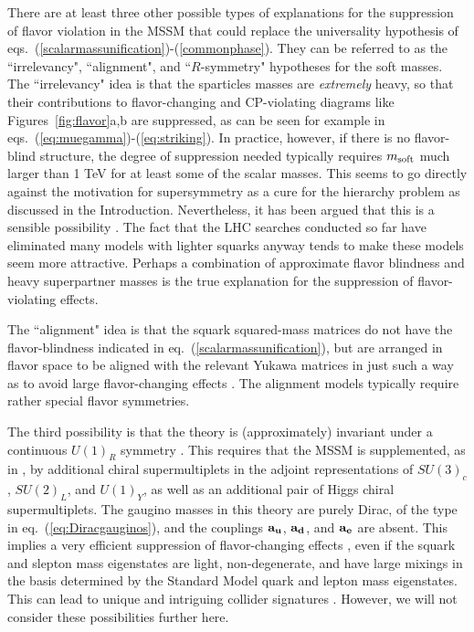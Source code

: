 \documentclass[11pt]{article}
\begin{document}
There are at least three other 
possible types of explanations for the suppression of flavor violation in 
the MSSM that could replace the universality hypothesis of 
eqs.~(\ref{scalarmassunification})-(\ref{commonphase}). They can be 
referred to as the ``irrelevancy", ``alignment", and ``$R$-symmetry" 
hypotheses for the soft masses. The ``irrelevancy" idea is that the 
sparticles masses are {\it extremely} heavy, so that their contributions 
to flavor-changing and CP-violating diagrams like 
Figures~\ref{fig:flavor}a,b are suppressed, as can be seen for example in 
eqs.~(\ref{eq:muegamma})-(\ref{eq:striking}).  In practice, however, 
if there is no flavor-blind structure, the 
degree of suppression needed typically requires $m_{\rm soft}$ much 
larger than 1 TeV for at least some of the scalar masses. This seems to 
go directly against the motivation for supersymmetry as a cure for the 
hierarchy problem as discussed in the Introduction. Nevertheless, it has 
been argued that this is a sensible possibility 
\cite{Moreminimal,splitsusy}. The fact that the LHC searches conducted so 
far have eliminated many models with lighter squarks anyway tends to make these 
models seem more attractive. Perhaps a combination of approximate flavor 
blindness and heavy superpartner masses is the true explanation 
for the suppression of flavor-violating effects.  

The ``alignment" idea is that the squark 
squared-mass matrices do not have the flavor-blindness indicated in 
eq.~(\ref{scalarmassunification}), but are arranged in flavor space to be 
aligned with the relevant Yukawa matrices in just such a way as to avoid 
large flavor-changing effects \cite{cterms,alignmentmodels}. The 
alignment models typically require rather special flavor symmetries. 

The third possibility is that the theory is (approximately) invariant under a 
continuous $U(1)_R$ symmetry \cite{Kribs:2007ac}. This requires that the 
MSSM is supplemented, as in \cite{Fox:2002bu}, by additional chiral 
supermultiplets in the adjoint representations of $SU(3)_c$, $SU(2)_L$, 
and $U(1)_Y$, as well as an additional pair of Higgs chiral 
supermultiplets. The gaugino masses in this theory are purely Dirac, of 
the type in eq.~(\ref{eq:Diracgauginos}), and the couplings $\bf a_u$, 
$\bf a_d$, and $\bf a_e$ are absent. This implies a very efficient 
suppression of flavor-changing effects 
\cite{Kribs:2007ac,Blechman:2008gu}, even if the squark and slepton mass 
eigenstates are light, non-degenerate, and have large mixings in the 
basis determined by the Standard Model quark and lepton mass eigenstates. 
This can lead to unique and intriguing collider signatures 
\cite{Kribs:2007ac,Plehn:2008ae}. However, we will not consider these 
possibilities further here.
\end{document}
